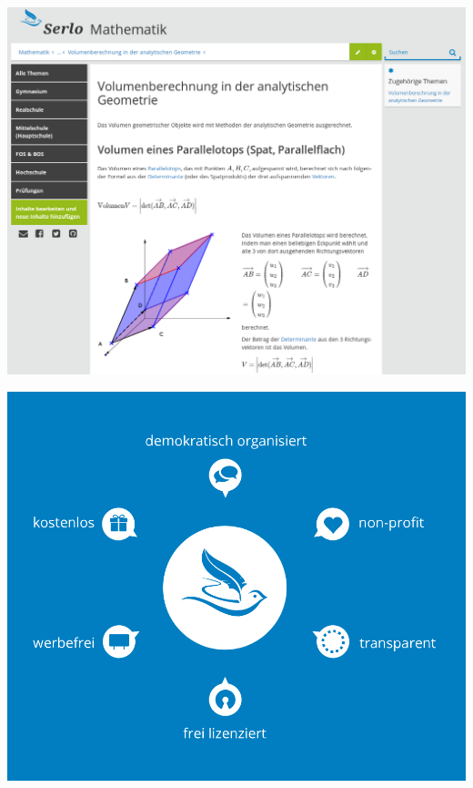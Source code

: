 \documentclass[aspectratio=169]{beamer}
\begin{document}
\begingroup
\begin{frame}
    \centering
    \includegraphics[height=0.9\textheight]{serlo.png}
\end{frame}
\endgroup

\begingroup
{}
\begin{frame}
    \centering
    \includegraphics[height=\textheight]{serlo-vision.png}
\end{frame}
\endgroup
\end{document}
